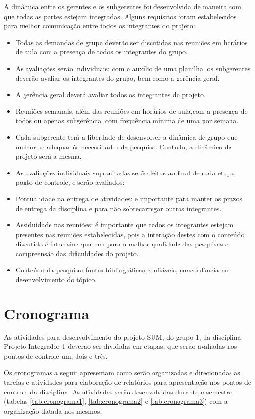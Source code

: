   A dinâmica entre os gerentes e os subgerentes foi desenvolvida de maneira com que todas as partes estejam integradas. Alguns requisitos foram estabelecidos para melhor comunicação entre todos os integrantes do projeto:

  \begin{itemize}
    \item Todas as demandas de grupo deverão ser discutidas nas reuniões em horários de aula com a presença de todos os integrantes do grupo.
    \item As avaliações serão individuais: com o auxílio de uma planilha, os subgerentes deverão avaliar os integrantes do grupo, bem como a gerência geral.
    \item A gerência geral deverá avaliar todos os integrantes do projeto.
    \item Reuniões semanais, além das reuniões em horários de aula,com a presença de todos ou apenas subgerência, com frequência mínima de uma por semana.
    \item Cada subgerente terá a liberdade de desenvolver a dinâmica de grupo que melhor se adequar às necessidades da pesquisa. Contudo, a dinâmica de projeto será a mesma.
    \item As avaliações individuais supracitadas serão feitas ao final de cada etapa, ponto de controle, e serão avaliados:
    \item Pontualidade na entrega de atividades: é importante para manter os prazos de entrega da disciplina e para não sobrecarregar outros integrantes.
    \item Assiduidade nas reuniões: é importante que todos os integrantes estejam presentes nas reuniões estabelecidas, pois a interação destes com o conteúdo discutido é fator sine qua non para a melhor qualidade das pesquisas e compreensão das dificuldades do projeto.
    \item Conteúdo da pesquisa: fontes bibliográficas confiáveis, concordância no desenvolvimento do tópico.
  \end{itemize}

\section{Cronograma}

As atividades para desenvolvimento do projeto SUM, do grupo 1, da disciplina Projeto Integrador 1 deverão ser divididas em etapas, que serão avaliadas nos pontos de controle um, dois e três.

Os cronogramas a seguir apresentam como serão organizadas e direcionadas  as tarefas e atividades para elaboração de relatórios para apresentação nos pontos de controle da disciplina. As atividades serão desenvolvidas durante o semestre (tabelas \ref{tab:cronograma1}, \ref{tab:cronograma2} e \ref{tab:cronograma3}) com a organização datada nos mesmos.

